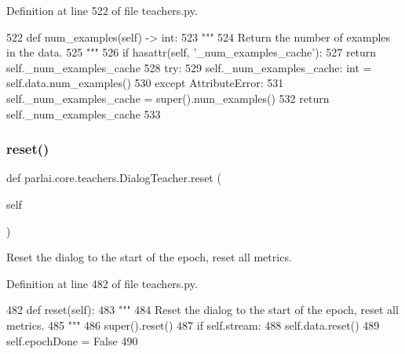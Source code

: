 Definition at line 522 of file teachers.\+py.


\begin{DoxyCode}
522     \textcolor{keyword}{def }num\_examples(self) -> int:
523         \textcolor{stringliteral}{"""}
524 \textcolor{stringliteral}{        Return the number of examples in the data.}
525 \textcolor{stringliteral}{        """}
526         \textcolor{keywordflow}{if} hasattr(self, \textcolor{stringliteral}{'\_num\_examples\_cache'}):
527             \textcolor{keywordflow}{return} self.\_num\_examples\_cache
528         \textcolor{keywordflow}{try}:
529             self.\_num\_examples\_cache: int = self.data.num\_examples()
530         \textcolor{keywordflow}{except} AttributeError:
531             self.\_num\_examples\_cache = super().num\_examples()
532         \textcolor{keywordflow}{return} self.\_num\_examples\_cache
533 
\end{DoxyCode}
\mbox{\label{classparlai_1_1core_1_1teachers_1_1DialogTeacher_a393f94ea28e1733f575a9f36a0b43c18}} 
\subsubsection{\texorpdfstring{reset()}{reset()}}
{\footnotesize\ttfamily def parlai.\+core.\+teachers.\+Dialog\+Teacher.\+reset (\begin{DoxyParamCaption}\item[{}]{self }\end{DoxyParamCaption})}

\begin{DoxyVerb}Reset the dialog to the start of the epoch, reset all metrics.
\end{DoxyVerb}
 

Definition at line 482 of file teachers.\+py.


\begin{DoxyCode}
482     \textcolor{keyword}{def }reset(self):
483         \textcolor{stringliteral}{"""}
484 \textcolor{stringliteral}{        Reset the dialog to the start of the epoch, reset all metrics.}
485 \textcolor{stringliteral}{        """}
486         super().reset()
487         \textcolor{keywordflow}{if} self.stream:
488             self.data.reset()
489             self.epochDone = \textcolor{keyword}{False}
490 
\end{DoxyCode}
\mbox{\label{classparlai_1_1core_1_1teachers_1_1DialogTeacher_a55fc9dead757489e127ec1a872849376}} 

